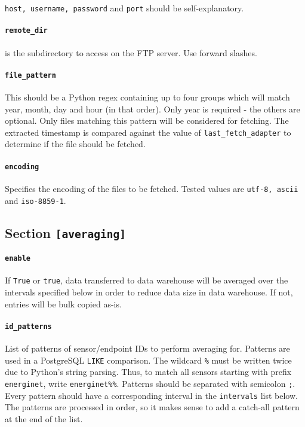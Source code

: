 {\texttt{host, username, password} and \texttt{port} should be self-explanatory.

\paragraph{\texttt{remote\_dir}} is the subdirectory to access on the FTP server. Use forward slashes.

\paragraph{\texttt{file\_pattern}} This should be a Python regex containing up to four groups which will match year, month, day and hour (in that order). Only year is required - the others are optional. Only files matching this pattern will be considered for fetching. The extracted timestamp is compared against the value of \texttt{last\_fetch\_adapter} to determine if the file should be fetched.

\paragraph{\texttt{encoding}} Specifies the encoding of the files to be fetched. Tested values are \texttt{utf-8, ascii} and \texttt{iso-8859-1}.


\subsection{Section \texttt{[averaging]}}

\paragraph{\texttt{enable}} If \texttt{True} or \texttt{true}, data transferred to data warehouse will be averaged over the intervals specified below in order to reduce data size in data warehouse. If not, entries will be bulk copied as-is.

\paragraph{\texttt{id\_patterns}} List of patterns of sensor/endpoint IDs to perform averaging for. Patterns are used in a PostgreSQL \texttt{LIKE} comparison. The wildcard \texttt{\%} must be written twice due to Python's string parsing. Thus, to match all sensors starting with prefix \texttt{energinet}, write \texttt{energinet\%\%}. Patterns should be separated with semicolon \texttt{;}. Every pattern should have a corresponding interval in the \texttt{intervals} list below. The patterns are processed in order, so it makes sense to add a catch-all pattern at the end of the list.

}
